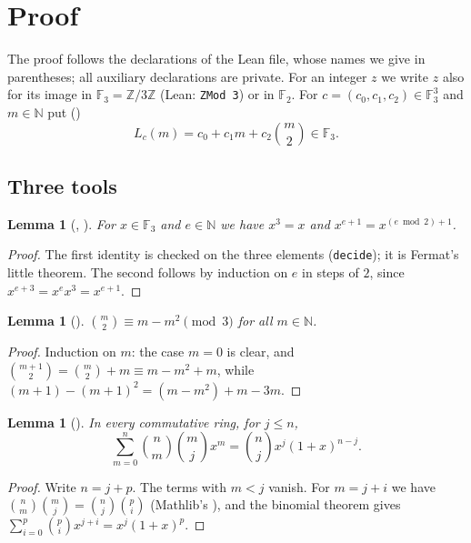 \documentclass[11pt]{amsart}
\theoremstyle{plain}
\newtheorem{lemma}[theorem]{Lemma}
\theoremstyle{definition}
\newcommand{\N}{\mathbb{N}}
\newcommand{\Z}{\mathbb{Z}}
\newcommand{\F}{\mathbb{F}}
\begin{document}
\section{Proof}\label{sec:proof}

The proof follows the declarations of the Lean file, whose names we give in parentheses; all auxiliary declarations are private.
For an integer $z$ we write $z$ also for its image in $\F_3=\Z/3\Z$ (Lean: \texttt{ZMod 3}) or in $\F_2$.
For $c=(c_0,c_1,c_2)\in\F_3^3$ and $m\in\N$ put ()
\[
  L_c(m)=c_0+c_1m+c_2\binom m2\in\F_3 .
\]

\subsection*{Three tools}

\begin{lemma}[, ]\label{lem:fermat}
For $x\in\F_3$ and $e\in\N$ we have $x^3=x$ and $x^{e+1}=x^{(e\bmod 2)+1}$.
\end{lemma}

\begin{proof}
The first identity is checked on the three elements (\texttt{decide}); it is Fermat's little theorem.
The second follows by induction on $e$ in steps of $2$, since $x^{e+3}=x^{e}x^3=x^{e+1}$.
\end{proof}

\begin{lemma}[]\label{lem:choose2}
$\binom m2\equiv m-m^2\pmod3$ for all $m\in\N$.
\end{lemma}

\begin{proof}
Induction on $m$: the case $m=0$ is clear, and $\binom{m+1}2=\binom m2+m\equiv m-m^2+m$, while $(m+1)-(m+1)^2=(m-m^2)+m-3m$.
\end{proof}

\begin{lemma}[]\label{lem:binom}
In every commutative ring, for $j\le n$,
\[
  \sum_{m=0}^{n}\binom nm\binom mj x^m=\binom njx^j(1+x)^{n-j}.
\]
\end{lemma}

\begin{proof}
Write $n=j+p$. The terms with $m<j$ vanish. For $m=j+i$ we have $\binom nm\binom mj=\binom nj\binom{p}{i}$ (Mathlib's ), and the binomial theorem gives $\sum_{i=0}^p\binom pix^{j+i}=x^j(1+x)^p$.
\end{proof}
\end{document}
